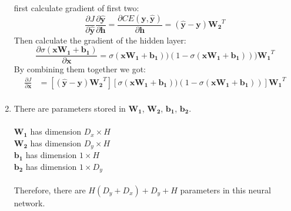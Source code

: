 \documentclass[10pt]{article}
\begin{document}
\begin{enumerate}[label=(\alph*)]
first calculate gradient of first two:
\begin{equation*}
	\frac{\partial J}{\partial \mathbf{\hat{y}}}\frac{\partial \mathbf{\hat{y}}}{\partial \mathbf{h}} = \frac{\partial CE(\mathbf{y}, \mathbf{\hat{y}})}{\partial \mathbf{h}} = (\mathbf{\hat{y}} - \mathbf{y})\mathbf{W_2}^T
\end{equation*}
Then calculate the gradient of the hidden layer:
\begin{equation*}
	\frac{\partial \sigma(\mathbf{xW_1}+\mathbf{b_1})}{\partial \mathbf{x}} = \sigma(\mathbf{xW_1}+\mathbf{b_1}))(1-\sigma(\mathbf{xW_1}+\mathbf{b_1})))\mathbf{W_1}^T
\end{equation*}
By combining them together we got:
\begin{equation*}
\begin{aligned}
	\frac{\partial J}{\partial \mathbf{x}} & = [(\mathbf{\hat{y}} - \mathbf{y})\mathbf{W_2}^T][\sigma(\mathbf{xW_1}+\mathbf{b_1}))(1-\sigma(\mathbf{xW_1}+\mathbf{b_1}))]\mathbf{W_1}^T\\
\end{aligned}
\end{equation*}

\item
There are parameters stored in $\mathbf{W_1}$, $\mathbf{W_2}$, $\mathbf{b_1}$, $\mathbf{b_2}$.\\
\\
$\mathbf{W_1}$ has dimension $D_x \times H$\\
$\mathbf{W_2}$ has dimension $D_y \times H$\\
$\mathbf{b_1}$ has dimension $1 \times H$\\
$\mathbf{b_2}$ has dimension $1 \times D_y$\\
\\ 
Therefore, there are $H(D_y+D_x)+D_y+H$ parameters in this neural network.
\end{enumerate}
\end{document}
